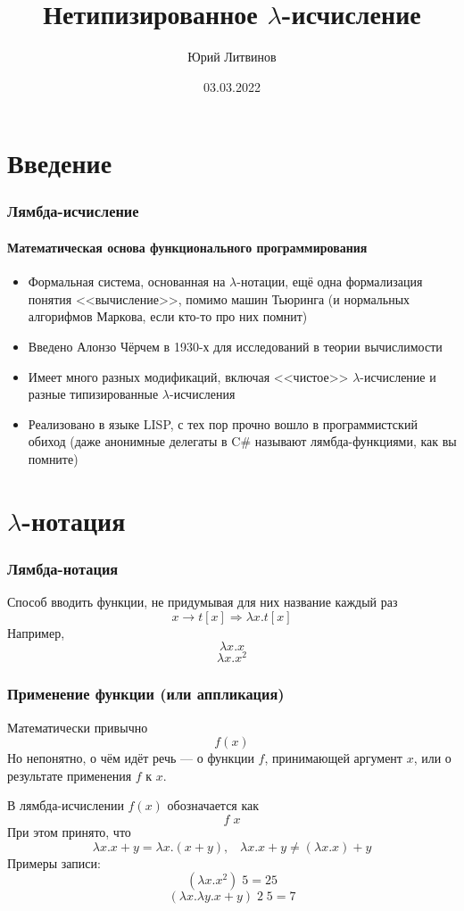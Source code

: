 \documentclass[xetex,mathserif,serif]{beamer}
\title{Нетипизированное $\lambda$-исчисление}
\author{Юрий Литвинов}
\date{03.03.2022}
\begin{document}
    
    \frame{\titlepage}

    \section{Введение}
    
    \begin{frame}
        \frametitle{Лямбда-исчисление}
        \framesubtitle{Математическая основа функционального программирования}
        \begin{itemize}
            \item Формальная система, основанная на $\lambda$-нотации, ещё одна формализация
                    понятия <<вычисление>>, помимо машин Тьюринга (и нормальных алгорифмов
                    Маркова, если кто-то про них помнит)
            \item Введено Алонзо Чёрчем в 1930-х для исследований в теории вычислимости
            \item Имеет много разных модификаций, включая <<чистое>> $\lambda$-исчисление и
                    разные типизированные $\lambda$-исчисления
            \item Реализовано в языке LISP, с тех пор прочно вошло в программистский обиход
                    (даже анонимные делегаты в C\# называют лямбда-функциями, как вы помните)
        \end{itemize}
    \end{frame}
        
    \section{$\lambda$-нотация}
        
    \begin{frame}
        \frametitle{Лямбда-нотация}
        Способ вводить функции, не придумывая для них название каждый раз
        $$x \rightarrow t[x] \Longrightarrow \lambda x.t[x]$$
        Например,
        $$\lambda x.x$$
        $$\lambda x.x^2$$
    \end{frame}

    \begin{frame}
        \frametitle{Применение функции (или аппликация)}
        Математически привычно
        $$f(x)$$
        Но непонятно, о чём идёт речь --- о функции $f$, принимающей аргумент $x$, или о результате применения
        $f$ к $x$. 

        В лямбда-исчислении $f(x)$ обозначается как
        $$f \; x$$
        При этом принято, что
        $$\lambda x. x + y = \lambda x.(x + y), \;\;\; 
        \lambda x. x + y \neq (\lambda x.x) + y$$
        Примеры записи:
        $$(\lambda x.x^2) \; 5 = 25$$
        $$(\lambda x.\lambda y.x + y) \; 2 \; 5 = 7$$
    \end{frame}
\end{document}
